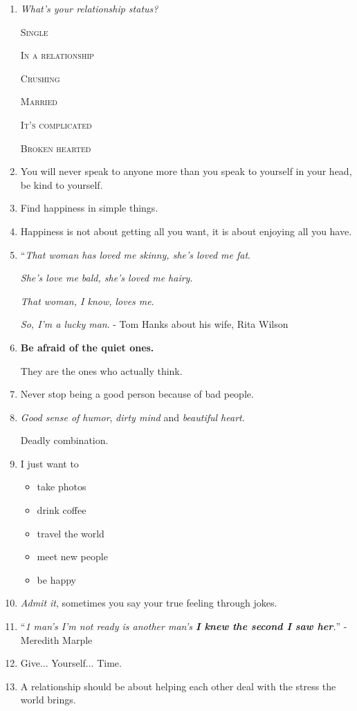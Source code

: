 \documentclass{article}
\numberwithin{equation}{section}
\begin{document}
\begin{enumerate}
    Because women don't follow unsuccessful men. - Universal Truth
    \item \textit{What's your relationship status?}
    
    \textsc{Single}
    
    \textsc{In a relationship}
    
    \textsc{Crushing}
    
    \textsc{Married}
    
    \textsc{It's complicated}
    
    \textsc{Broken hearted}
    \item You will never speak to anyone more than you speak to yourself in your head, be kind to yourself.
    \item Find happiness in simple things.
    \item Happiness is not about getting all you want, it is about enjoying all you have.
    \item ``\textit{That woman has loved me skinny, she's loved me fat}.
    
    \textit{She's love me bald, she's loved me hairy}.
    
    \textit{That woman, I know, loves me}.
    
    \textit{So, I'm a lucky man}. - Tom Hanks about his wife, Rita Wilson
    \item \textbf{Be afraid of the quiet ones.}
    
    They are the ones who actually think.
    \item Never stop being a good person because of bad people.
    \item \textit{Good sense of humor}, \textit{dirty mind} and \textit{beautiful heart}.
    
    Deadly combination.
    \item I just want to
    \begin{itemize}
        \item take photos
        \item drink coffee
        \item travel the world
        \item meet new people
        \item be happy
    \end{itemize}
    \item \textit{Admit it}, sometimes you say your true feeling through jokes.
    \item ``\textit{1 man's \emph{I'm not ready} is another man's \textbf{I knew the second I saw her}.}'' - Meredith Marple
    \item Give$\ldots$ Yourself$\ldots$ Time.
    \item A relationship should be about helping each other deal with the stress the world brings.
    

\end{enumerate}
\end{document}
